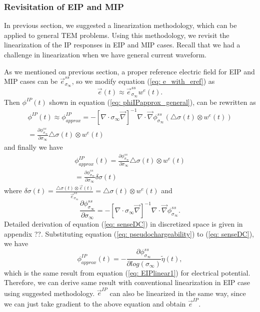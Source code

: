 \documentclass[a4paper, 11pt]{article}
\renewcommand{\div}{\nabla\cdot}
\newcommand{\grad}{\vec \nabla}
\newcommand{\siginf}{\sigma_\infty}
\newcommand{\dsig}{\triangle\sigma}
\newcommand {\e}  { {\vec e} }
\newcommand{\peta}{\tilde{\eta}}
\newcommand{\sigpert}{\delta\sigma}
\begin{document}
\clearpage

\subsubsection{Revisitation of EIP and MIP}
In previous section, we suggested a linearization methodology, which can be applied to general TEM problems. Using this methodology, we revisit the linearization of the IP responses in EIP and MIP cases. Recall that we had a challenge in linearization when we have general current waveform.

As we mentioned on previous section, a proper reference electric field for EIP and MIP cases can be $\e^{ss}_{\siginf}$, so we modify equation (\ref{eq: e_with_eref}) as
\begin{equation*}
    \e(t) \approx \e^{ss}_{\siginf}w^e(t).
\end{equation*}
Then $\phi^{IP}(t)$ shown in equation (\ref{eq: phiIPapprox_general}), can be rewritten as
\begin{eqnarray*}
  \phi^{IP}(t) \approx \phi^{IP}_{approx} =  -[\div\siginf\grad]^{-1}\div\grad\phi^{ss}_{\siginf}(\dsig(t)\otimes w^e(t)) \\
               =\frac{\partial \phi^{ss}_{\siginf}}{\partial \siginf}\dsig(t)\otimes w^e(t)
\end{eqnarray*}
and finally we have
\begin{eqnarray}
    \phi^{IP}_{approx}(t) = \frac{\partial \phi^{ss}_{\siginf}}{\partial \siginf}\dsig(t)\otimes w^e(t) \nonumber\\
                 =\frac{\partial \phi^{ss}_{\siginf}}{\partial \siginf}\sigpert(t)
\end{eqnarray}
where $\sigpert(t) = \frac{\dsig(t)\otimes \e(t)}{\e^{ss}_{\siginf}}=\dsig(t)\otimes w^e(t)$ and
\begin{equation}
    \frac{\partial \phi^{ss}_{\siginf}}{\partial \siginf} = -[\div\siginf\grad]^{-1}\div\grad\phi^{ss}_{\siginf}.
    \label{eq: senseDC}
\end{equation}
Detailed derivation of equation (\ref{eq: senseDC}) in discretized space is given in appendix ??. Substituting equation (\ref{eq: pseudochargeability}) to (\ref{eq: senseDC}), we have
\begin{equation}
    \phi^{IP}_{approx}(t) = -\frac{\partial \phi^{ss}_{\siginf}}{\partial log(\siginf)}\peta(t),
    \label{eq: phiIPapprox}
\end{equation}
which is the same result from equation (\ref{eq: EIPlinear1}) for electrical potential. Therefore, we can derive same result with conventional linearization in EIP case using suggested methodology. $\e^{IP}$ can also be linearized in the same way, since we can just take gradient to the above equation and obtain $\e^{IP}$.
\end{document}
